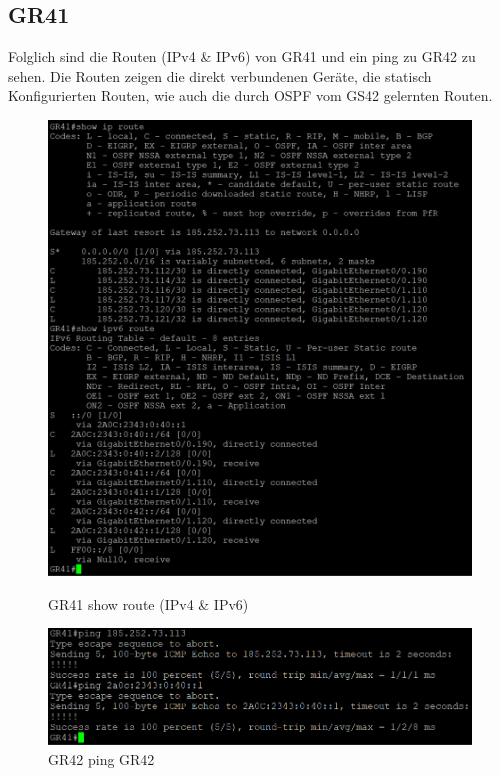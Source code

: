 \documentclass{article}
\begin{document}
\subsection{GR41}
Folglich sind die Routen (IPv4 \& IPv6) von GR41 und ein ping zu GR42 zu sehen. Die Routen zeigen die direkt verbundenen Geräte, die statisch Konfigurierten Routen, wie auch die durch OSPF vom GS42 gelernten Routen.\\
\begin{figure}[!htp]
  \centering
  \begin{minipage}[b]{0.45\textwidth}
    \includegraphics[width=\textwidth]{Arbeitsergebnisse/gr41/gr41_show_route.png}
    \caption{GR41 show route (IPv4 \& IPv6)}
  \end{minipage}
  \hspace{0.8cm}
  \begin{minipage}[b]{0.45\textwidth}
    \includegraphics[width=\textwidth]{Arbeitsergebnisse/gr41/gr41_ping_gr42.PNG}
    \caption{GR42 ping GR42}
  \end{minipage}
\end{figure}
\end{document}
